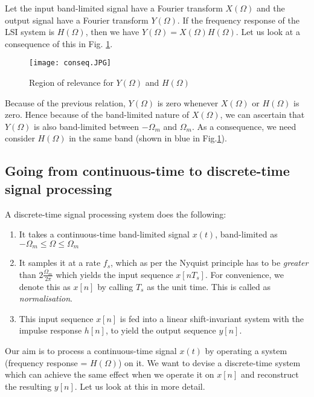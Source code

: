 Let the input band-limited signal have a Fourier transform $X(\Omega)$ and the output signal have a Fourier transform $Y(\Omega)$. If the frequency response of the LSI system is $H(\Omega)$, then we have $Y(\Omega) = X(\Omega)H(\Omega)$. Let us look at a consequence of this in Fig. \ref{conseq}. 
\begin{figure}[h] 
        \centering
        
                \texttt{[image: conseq.JPG]}
                \caption{Region of relevance for $Y(\Omega)$ and $H(\Omega)$}
                \label{conseq}
        
\end{figure}
Because of the previous relation, $Y(\Omega)$ is zero whenever $X(\Omega)$ or $H(\Omega)$ is zero. Hence because of the band-limited nature of $X(\Omega)$, we can ascertain that $Y(\Omega)$ is also band-limited between $-\Omega_{m}$ and $\Omega_{m}$. As a consequence, we need consider $H(\Omega)$ in the same band (shown in blue in Fig.\ref{conseq}). 



\subsection{Going from continuous-time to discrete-time signal processing}
A discrete-time signal processing system does the following:
\begin{enumerate}
\item It takes a continuous-time band-limited signal $x(t)$, band-limited as $-\Omega_{m} \leq \Omega \leq \Omega_{m}$
\item It samples it at a rate $f_{s}$, which as per the Nyquist principle has to be \textit{greater} than $2\frac{\Omega_{m}}{2\pi}$ which yields the input sequence $x[nT_{s}]$. For convenience, we denote this as $x[n]$ by calling $T_{s}$ as the unit time. This is called as \textit{normalisation}.
\item This input sequence $x[n]$ is fed into a linear shift-invariant system with the impulse response $h[n]$, to yield the output sequence $y[n]$.  
\end{enumerate}

Our aim is to process a continuous-time signal $x(t)$ by operating a system (frequency response = $H(\Omega)$) on it. We want to devise a discrete-time system which can achieve the same effect when we operate it on $x[n]$ and reconstruct the resulting $y[n]$. Let us look at this in more detail.
\\

